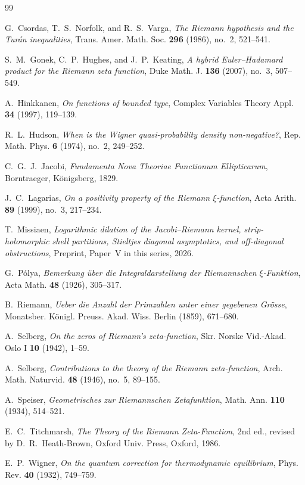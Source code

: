 \documentclass[11pt,reqno]{amsart}
\theoremstyle{definition}
\theoremstyle{remark}
\numberwithin{equation}{section}
\begin{document}
\begin{thebibliography}{99}

G.~Csordas, T.~S.~Norfolk, and R.~S.~Varga,
\emph{The Riemann hypothesis and the Tur\'an inequalities},
Trans. Amer. Math. Soc. \textbf{296} (1986), no.~2, 521--541.

S.~M.~Gonek, C.~P.~Hughes, and J.~P.~Keating,
\emph{A hybrid Euler--Hadamard product for the Riemann zeta function},
Duke Math. J. \textbf{136} (2007), no.~3, 507--549.

A.~Hinkkanen,
\emph{On functions of bounded type},
Complex Variables Theory Appl. \textbf{34} (1997), 119--139.

R.~L.~Hudson,
\emph{When is the Wigner quasi-probability density non-negative?},
Rep. Math. Phys. \textbf{6} (1974), no.~2, 249--252.

C.~G.~J.~Jacobi,
\emph{Fundamenta Nova Theoriae Functionum Ellipticarum},
Borntraeger, K\"onigsberg, 1829.

J.~C.~Lagarias,
\emph{On a positivity property of the Riemann $\xi$-function},
Acta Arith. \textbf{89} (1999), no.~3, 217--234.

T.~Missiaen,
\emph{Logarithmic dilation of the Jacobi--Riemann kernel, strip-holomorphic shell partitions, Stieltjes diagonal asymptotics, and off-diagonal obstructions},
Preprint, Paper~V in this series, 2026.

G.~P\'olya,
\emph{Bemerkung \"uber die Integraldarstellung der Riemannschen $\xi$-Funktion},
Acta Math. \textbf{48} (1926), 305--317.

B.~Riemann,
\emph{Ueber die Anzahl der Primzahlen unter einer gegebenen Gr\"osse},
Monatsber. K\"onigl. Preuss. Akad. Wiss. Berlin (1859), 671--680.

A.~Selberg,
\emph{On the zeros of Riemann's zeta-function},
Skr. Norske Vid.-Akad. Oslo I \textbf{10} (1942), 1--59.

A.~Selberg,
\emph{Contributions to the theory of the Riemann zeta-function},
Arch. Math. Naturvid. \textbf{48} (1946), no.~5, 89--155.

A.~Speiser,
\emph{Geometrisches zur Riemannschen Zetafunktion},
Math. Ann. \textbf{110} (1934), 514--521.

E.~C.~Titchmarsh,
\emph{The Theory of the Riemann Zeta-Function},
2nd ed., revised by D.~R.~Heath-Brown, Oxford Univ. Press, Oxford, 1986.

E.~P.~Wigner,
\emph{On the quantum correction for thermodynamic equilibrium},
Phys. Rev. \textbf{40} (1932), 749--759.

\end{thebibliography}
\end{document}
